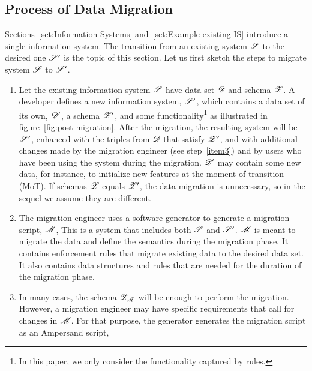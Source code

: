\documentclass{elsarticle}
\begin{document}
\subsection{Process of Data Migration}
   Sections~\ref{sct:Information Systems} and~\ref{sct:Example existing IS} introduce a single information system.
   The transition from an existing system $\mathscr{S}$ to the desired one $\mathscr{S}'$ is the topic of this section.
   Let us first sketch the steps to migrate system $\mathscr{S}$ to $\mathscr{S}'$.
\begin{enumerate}
   \item Let the existing information system $\mathscr{S}$ have data set $\mathscr{D}$ and schema $\mathscr{Z}$.
         A developer defines a new information system, $\mathscr{S}'$, which contains a data set of its own, $\mathscr{D}'$, a schema $\mathscr{Z}'$, and some functionality\footnote{In this paper, we only consider the functionality captured by rules.} as illustrated in figure~\ref{fig:post-migration}.
         After the migration, the resulting system will be $\mathscr{S}'$, enhanced with the triples from $\mathscr{D}$ that satisfy $\mathscr{Z}'$,
         and with additional changes made by the migration engineer (see step~\ref{item3}) and by users who have been using the system during the migration.
         $\mathscr{D}'$ may contain some new data,
         for instance, to initialize new features at the moment of transition (MoT).
         If schemas $\mathscr{Z}$ equals $\mathscr{Z}'$, the data migration is unnecessary, so in the sequel we assume they are different.
   \item The migration engineer uses a software generator to generate a migration script, $\mathscr{M}$,
         This is a system that includes both $\mathscr{S}$ and $\mathscr{S}'$.
         $\mathscr{M}$ is meant to migrate the data and define the semantics during the migration phase.
         It contains enforcement rules that migrate existing data to the desired data set.
         It also contains data structures and rules that are needed for the duration of the migration phase.
   \item\label{item3}
         In many cases, the schema $\mathscr{Z}_{\mathscr{M}}$ will be enough to perform the migration.
         However, a migration engineer may have specific requirements that call for changes in $\mathscr{M}$.
         For that purpose, the generator generates the migration script as an Ampersand script,

\end{enumerate}
\end{document}

